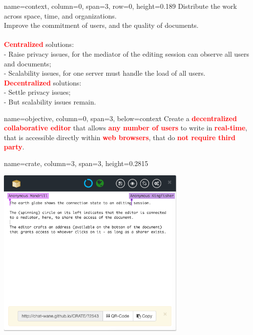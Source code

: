 \documentclass[a1paper, fontscale=0.4, portrait]{baposter}
\newcommand{\RED}[1]{\textcolor{red}{\textbf{#1}}}
\newcommand{\FIRSTROW}{0.189}
\begin{document}
\begin{poster}
  {name=context, column=0, span=3, row=0, height=\FIRSTROW} {
    Distribute the work across space, time, and organizations.\\
    Improve the commitment of users, and the quality of documents.\\
    \\
    \RED{Centralized} solutions: \\
    - Raise privacy issues, for the mediator of the editing session can
      observe all users and documents; \\
    - Scalability issues, for one server must handle the load of all users. \\
    \RED{Decentralized} solutions: \\
    - Settle privacy issues; \\
    - But scalability issues remain.
  }

  
  {name=objective, column=0, span=3, below=context}{ %
    Create a \RED{decentralized collaborative editor} that allows \RED{any number
      of users} to write in \RED{real-time}, that is accessible directly within
    \RED{web browsers}, that do \RED{not require third party}.
  }

  {name=crate, column=3, span=3, height=0.2815}{ %
    \begin{center}
      \includegraphics[width=0.7\textwidth]{img/crate3.png}
    \end{center}

}
\end{poster}
\end{document}

